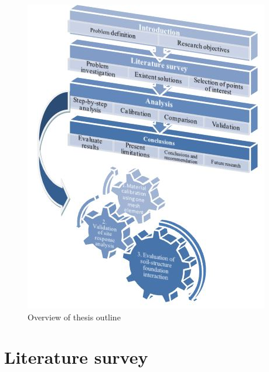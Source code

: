 \documentclass[10pt,a4paper]{report}
\begin{document}
\begin{figure}[h!]
	\centering
	\includegraphics[width=0.7\linewidth]{"outline"}
	\caption{Overview of thesis outline}
	\label{outline}
\end{figure}

\chapter{Literature survey}
\end{document}
